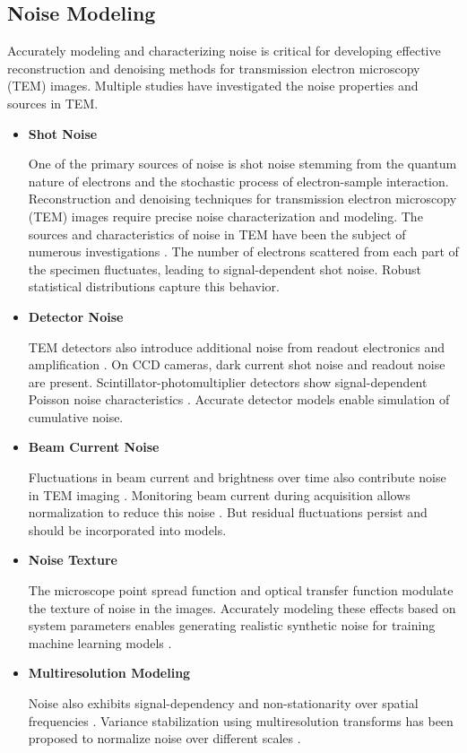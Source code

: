 \clearpage
\subsection{Noise Modeling}
Accurately modeling and characterizing noise is critical for developing effective reconstruction and denoising methods for transmission electron microscopy (TEM) images. Multiple studies have investigated the noise properties and sources in TEM.
\begin{itemize}
  \item \textbf{Shot Noise}
  
      One of the primary sources of noise is shot noise stemming from the quantum nature of electrons and the stochastic process of electron-sample interaction. Reconstruction and denoising techniques for transmission electron microscopy (TEM) images require precise noise characterization and modeling. The sources and characteristics of noise in TEM have been the subject of numerous investigations \cite{Ishizuka1977}\cite{Nellist1999}. The number of electrons scattered from each part of the specimen fluctuates, leading to signal-dependent shot noise. Robust statistical distributions capture this behavior.
  \item \textbf{Detector Noise}
  
      TEM detectors also introduce additional noise from readout electronics and amplification \cite{Barthel2010}. On CCD cameras, dark current shot noise and readout noise are present. Scintillator-photomultiplier detectors show signal-dependent Poisson noise characteristics \cite{Ruskin2013}. Accurate detector models enable simulation of cumulative noise.
  \item \textbf{Beam Current Noise}
  
      Fluctuations in beam current and brightness over time also contribute noise in TEM imaging \cite{Faruqi2011}. Monitoring beam current during acquisition allows normalization to reduce this noise \cite{Faruqi2011} \cite{Sang2014}. But residual fluctuations persist and should be incorporated into models.
  \item \textbf{Noise Texture}
  
      The microscope point spread function and optical transfer function modulate the texture of noise in the images. Accurately modeling these effects based on system parameters enables generating realistic synthetic noise for training machine learning models \cite{Ishizuka1980}.
  \item \textbf{Multiresolution Modeling}
  
       Noise also exhibits signal-dependency and non-stationarity over spatial frequencies \cite{Falsini2023}\cite{Jones2015}. Variance stabilization using multiresolution transforms has been proposed to normalize noise over different scales \cite{Boulanger2007}.
  
\end{itemize}

